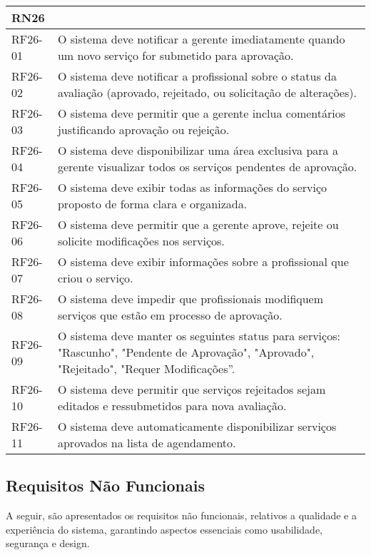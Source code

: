 \begin{longtable}{|p{}|p{}|}
	\multicolumn{2}{|l|}{\textbf{RN26}} \\ \hline
	RF26-01 & O sistema deve notificar a gerente imediatamente quando um novo serviço for submetido para aprovação. \\ \hline
	RF26-02 & O sistema deve notificar a profissional sobre o status da avaliação (aprovado, rejeitado, ou solicitação de alterações). \\ \hline
	RF26-03 & O sistema deve permitir que a gerente inclua comentários justificando aprovação ou rejeição. \\ \hline
	RF26-04 & O sistema deve disponibilizar uma área exclusiva para a gerente visualizar todos os serviços pendentes de aprovação. \\ \hline
	RF26-05 & O sistema deve exibir todas as informações do serviço proposto de forma clara e organizada. \\ \hline
	RF26-06 & O sistema deve permitir que a gerente aprove, rejeite ou solicite modificações nos serviços. \\ \hline
	RF26-07 & O sistema deve exibir informações sobre a profissional que criou o serviço. \\ \hline
	RF26-08 & O sistema deve impedir que profissionais modifiquem serviços que estão em processo de aprovação. \\ \hline
	RF26-09 & O sistema deve manter os seguintes status para serviços: "Rascunho", "Pendente de Aprovação", "Aprovado", "Rejeitado", "Requer Modificações”. \\ \hline
	RF26-10 & O sistema deve permitir que serviços rejeitados sejam editados e ressubmetidos para nova avaliação. \\ \hline
	RF26-11 & O sistema deve automaticamente disponibilizar serviços aprovados na lista de agendamento. \\ \hline
	

\end{longtable}



\subsection{Requisitos Não Funcionais}

A seguir, são apresentados os requisitos não funcionais, relativos a qualidade e a experiência do sistema, garantindo aspectos essenciais como usabilidade, segurança e design.

